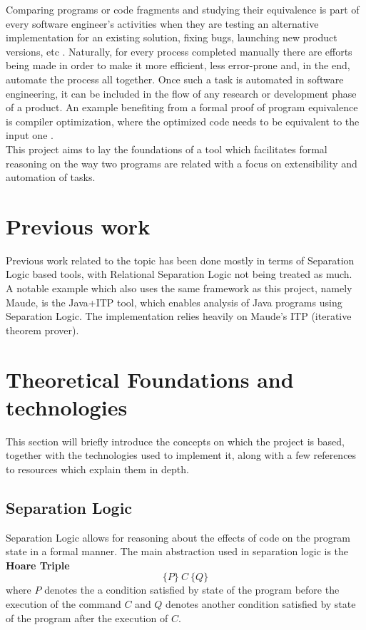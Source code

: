 \documentclass[12pt,a4paper]{article}
\begin{document}
Comparing programs or code fragments and studying their equivalence is part of every software engineer's activities when they are testing an alternative implementation for an existing solution, fixing bugs, launching new product versions, etc . Naturally, for every process completed manually there are efforts being made in order to make it more efficient, less error-prone and, in the end, automate the process all together. Once such a task is automated in software engineering, it can be included in the flow of any research or development phase of a product. An example benefiting from a formal proof of program equivalence is compiler optimization, where the optimized code needs to be equivalent to the input one . \\

This project aims to lay the foundations of a tool which facilitates formal reasoning on the way two programs are related with a focus on extensibility and automation of tasks.

\section{Previous work}
Previous work related to the topic has been done mostly in terms of Separation Logic based tools, with Relational Separation Logic not being treated as much. \\

A notable example which also uses the same framework as this project, namely Maude, is the Java+ITP\cite{JAVAITP} tool, which enables analysis of Java programs using Separation Logic. The implementation relies heavily on Maude's ITP (iterative theorem prover).

\section{Theoretical Foundations and technologies}
This section will briefly introduce the concepts on which the project is based, together with the technologies used to implement it, along with a few references to resources which explain them in depth.
\subsection{Separation Logic}
Separation Logic allows for reasoning about the effects of code on the program state in a formal manner. The main abstraction used in separation logic is the \textbf{Hoare Triple}
\[ \{P\}\  C\  \{Q\} \]
where \(P\) denotes the a condition satisfied by state of the program before the execution of the command \(C\) and \(Q\) denotes another condition satisfied by state of the program after the execution of \(C\).
\\
\end{document}
